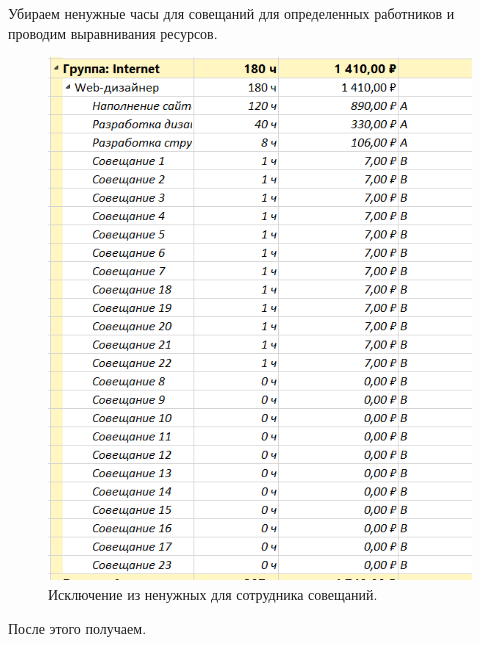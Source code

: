 \documentclass[a4paper,14pt]{extreport} %
\begin{document}
\begin{enumerate}
Убираем ненужные часы для совещаний для определенных работников и проводим выравнивания ресурсов. 

\begin{figure}[H]
	\centering
	\caption{Исключение из ненужных для сотрудника совещаний. }
	\includegraphics[scale=0.8]{meetings}
\end{figure}

После этого получаем.


\end{enumerate}
\end{document}
